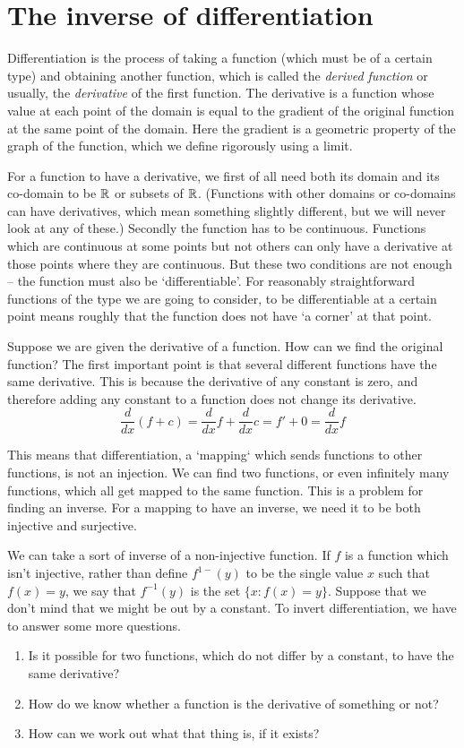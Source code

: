 \chapter{The inverse of differentiation}
Differentiation is the process of taking a function (which must be of a certain type) and obtaining another function, which is called the \emph{derived function} or usually, the \emph{derivative} of the first function. The derivative is a function whose value at each point of the domain is equal to the gradient of the original function at the same point of the domain. Here the gradient is a geometric property of the graph of the function, which we define rigorously using a limit.

For a function to have a derivative, we first of all need both its domain and its co-domain to be $\mathbb{R}$ or subsets of $\mathbb{R}$. (Functions with other domains or co-domains can have derivatives, which mean something slightly different, but we will never look at any of these.) Secondly the function has to be continuous. Functions which are continuous at some points but not others can only have a derivative at those points where they are continuous. But these two conditions are not enough -- the function must also be `differentiable'. For reasonably straightforward functions of the type we are going to consider, to be differentiable at a certain point  means roughly that the function does not have `a corner' at that point.

Suppose we are given the derivative of a function. How can we find the original function? The first important point is that several different functions have the same derivative. This is because the derivative of any constant is zero, and therefore adding any constant to a function does not change its derivative. 
\[ \frac{d}{dx}(f + c) = \frac{d}{dx}f + \frac{d}{dx}c = f' + 0 = \frac{d}{dx}f \] 

This means that differentiation, a `mapping` which sends functions to other functions, is not an injection. We can find two functions, or even infinitely many functions, which all get mapped to the same function. This is a problem for finding an inverse. For a mapping to have an inverse, we need it to be both injective and surjective. 

We can take a sort of inverse of a non-injective function. If $f$ is a function which isn't injective, rather than define $f^{1-}(y)$ to be the single value $x$ such that $f(x) = y$, we say that $f^{-1}(y)$ is the set $\{ x : f(x) = y \}$.  
Suppose that we don't mind that we might be out by a constant. To invert differentiation, we have to answer some more questions.
\begin{enumerate}
\item Is it possible for two functions, which do not differ by a constant, to have the same derivative?
\item How do we know whether a function is the derivative of something or not?
\item How can we work out what that thing is, if it exists?
\end{enumerate}

